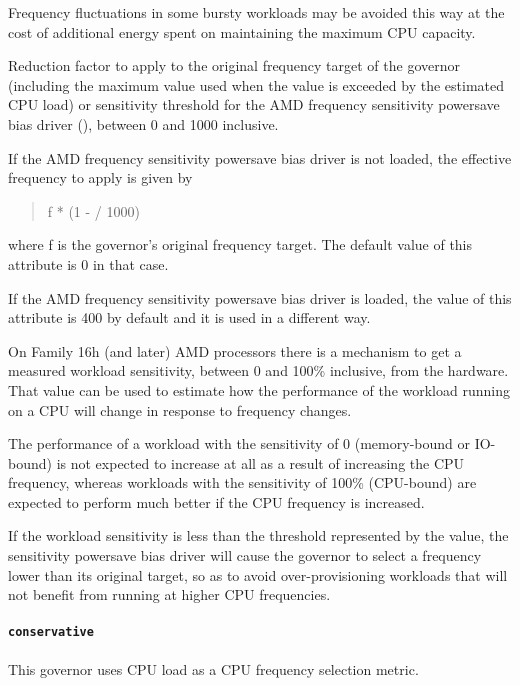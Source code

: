 \documentclass[a4paper,8pt,english]{sphinxmanual}
\begin{document}
\begin{description}
Frequency fluctuations in some bursty workloads may be avoided this way
at the cost of additional energy spent on maintaining the maximum CPU
capacity.

\item[{\code{powersave\_bias}}] \leavevmode
Reduction factor to apply to the original frequency target of the
governor (including the maximum value used when the 
value is exceeded by the estimated CPU load) or sensitivity threshold
for the AMD frequency sensitivity powersave bias driver
(), between 0 and 1000
inclusive.

If the AMD frequency sensitivity powersave bias driver is not loaded,
the effective frequency to apply is given by
\begin{quote}

f * (1 -  / 1000)
\end{quote}

where f is the governor's original frequency target.  The default value
of this attribute is 0 in that case.

If the AMD frequency sensitivity powersave bias driver is loaded, the
value of this attribute is 400 by default and it is used in a different
way.

On Family 16h (and later) AMD processors there is a mechanism to get a
measured workload sensitivity, between 0 and 100\% inclusive, from the
hardware.  That value can be used to estimate how the performance of the
workload running on a CPU will change in response to frequency changes.

The performance of a workload with the sensitivity of 0 (memory-bound or
IO-bound) is not expected to increase at all as a result of increasing
the CPU frequency, whereas workloads with the sensitivity of 100\%
(CPU-bound) are expected to perform much better if the CPU frequency is
increased.

If the workload sensitivity is less than the threshold represented by
the  value, the sensitivity powersave bias driver
will cause the governor to select a frequency lower than its original
target, so as to avoid over-provisioning workloads that will not benefit
from running at higher CPU frequencies.

\end{description}


\paragraph{\texttt{conservative}}
\label{admin-guide/pm/cpufreq:conservative}
This governor uses CPU load as a CPU frequency selection metric.
\end{document}

